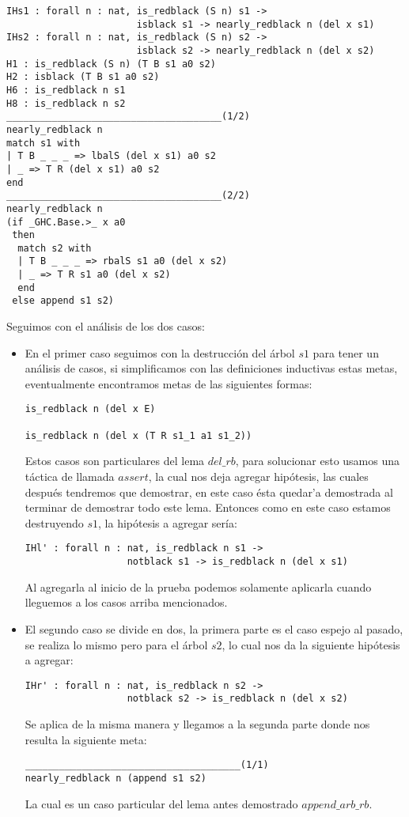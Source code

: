 \begin{verbatim}
IHs1 : forall n : nat, is_redblack (S n) s1 ->
                       isblack s1 -> nearly_redblack n (del x s1)
IHs2 : forall n : nat, is_redblack (S n) s2 ->
                       isblack s2 -> nearly_redblack n (del x s2)
H1 : is_redblack (S n) (T B s1 a0 s2)
H2 : isblack (T B s1 a0 s2)
H6 : is_redblack n s1
H8 : is_redblack n s2
______________________________________(1/2)
nearly_redblack n
match s1 with
| T B _ _ _ => lbalS (del x s1) a0 s2
| _ => T R (del x s1) a0 s2
end
______________________________________(2/2)
nearly_redblack n
(if _GHC.Base.>_ x a0
 then
  match s2 with
  | T B _ _ _ => rbalS s1 a0 (del x s2)
  | _ => T R s1 a0 (del x s2)
  end
 else append s1 s2)
\end{verbatim}

Seguimos con el análisis de los dos casos:
\begin{itemize}
  \item En el primer caso seguimos con la destrucci\'on del \'arbol $s1$ para tener un análisis de
  casos, si simplificamos con las definiciones inductivas estas metas, eventualmente encontramos
  metas de las siguientes formas:
\begin{verbatim}
is_redblack n (del x E)

is_redblack n (del x (T R s1_1 a1 s1_2))
\end{verbatim}
  Estos casos son particulares del lema \hyperref[lema_6]{$del\_rb$}, para solucionar esto 
  usamos una táctica de {\coq} llamada $assert$, la cual nos deja agregar hip\'otesis, las cuales 
  después tendremos que demostrar, en este caso \'esta quedar'a demostrada al terminar de demostrar 
  todo este lema. Entonces como en este caso estamos destruyendo $s1$, la hip\'otesis a agregar 
  ser\'ia:
\begin{verbatim}
IHl' : forall n : nat, is_redblack n s1 ->
                  notblack s1 -> is_redblack n (del x s1)
\end{verbatim}
  Al agregarla al inicio de la prueba podemos solamente aplicarla cuando lleguemos a los casos
  arriba mencionados.
  \item El segundo caso se divide en dos, la primera parte es el caso espejo al pasado, se realiza 
  lo mismo pero para el \'arbol $s2$, lo cual nos da la siguiente hipótesis a agregar:
\begin{verbatim}
IHr' : forall n : nat, is_redblack n s2 ->
                  notblack s2 -> is_redblack n (del x s2)
\end{verbatim}
  Se aplica de la misma manera y llegamos a la segunda parte donde nos resulta la siguiente meta:
\begin{verbatim}
______________________________________(1/1)
nearly_redblack n (append s1 s2)
\end{verbatim}
  La cual es un caso particular del lema antes demostrado \hyperref[lema_4]{$append\_arb\_rb$}.
\end{itemize}

